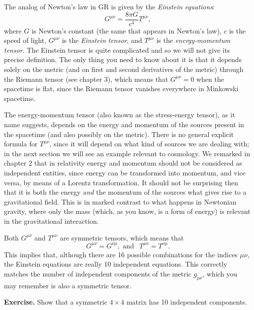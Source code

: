 \documentclass[11pt, a4paper,oneside,openright]{book}
\numberwithin{equation}{section}
\begin{document}
The analog of Newton's law in GR is given by the {\it Einstein equations}:
\begin{equation} \label{eq:einstein_eqs}
G^{\mu\nu}=\frac{8\pi G}{c^4}T^{\mu\nu},
\end{equation}
where $G$ is Newton's constant (the same that appears in Newton's law), $c$ is the speed of light, $G^{\mu\nu}$ is the {\it Einstein tensor}, and $T^{\mu\nu}$ is the {\it energy-momentum tensor}. The Einstein tensor is quite complicated and so we will not give its precise definition. The only thing you need to know about it is that it depends solely on the metric (and on first and second derivatives of the metric) through the Riemann tensor (see chapter 3), which means that $G^{\mu\nu}=0$ when the spacetime is flat, since the Riemann tensor vanishes everywhere in Minkowski spacetime.

The energy-momentum tensor (also known as the stress-energy tensor), as it name suggests, depends on the energy and momentum of the sources present in the spacetime (and also possibly on the metric). There is no general explicit formula for $T^{\mu\nu}$, since it will depend on what kind of sources we are dealing with; in the next section we will see an example relevant to cosmology. We remarked in chapter 2 that in relativity energy and momentum should not be considered as independent entities, since energy can be transformed into momentum, and vice versa, by means of a Lorentz transformation. It should not be surprising then that it is both the energy {\it and} the momentum of the sources what gives rise to a gravitational field. This is in marked contrast to what happens in Newtonian gravity, where only the mass (which, as you know, is a form of energy) is relevant in the gravitational interaction.

Both $G^{\mu\nu}$ and $T^{\mu\nu}$ are symmetric tensors, which means that
\begin{equation}
G^{\mu\nu}=G^{\nu\mu},\mbox{ and }~~T^{\mu\nu}=T^{\nu\mu}.
\end{equation}
This implies that, although there are 16 possible combinations for the indices $\mu\nu$, the Einstein equations are really 10 independent equations. This correctly matches the number of independent components of the metric $g_{\mu\nu}$, which you may remember is also a symmetric tensor.

\par\vspace{\baselineskip}

{\bf Exercise.} Show that a symmetric $4\times4$ matrix has 10 independent components.
\end{document}
